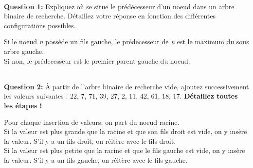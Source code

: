 \documentclass[iutinfo,a4paper,10pt]{ustl-tdtp}
\begin{document}
~\\ \textbf{Question 1:} Expliquez où se situe le prédécesseur d'un noeud dans
un arbre binaire de recherche. Détaillez votre réponse en fonction des
différentes configurations possibles.

\begin{solution}
{\color{red}
Si le noeud \emph{n} possède un fils gauche, le prédecesseur de \emph{n} est le maximum du sous arbre gauche.\\
	Si non, le prédecesseur est le premier parent gauche du noeud.}
\end{solution}

~\\ \textbf{Question 2:} À partir de l'arbre binaire de recherche
vide, ajoutez successivement les valeurs suivantes : 22, 7, 71, 39,
27, 2, 11, 42, 61, 18, 17. \textbf{Détaillez toutes les étapes !}\\

\begin{solution}
{\color{red}
Pour chaque insertion de valeurs, on part du noeud racine. \\
	Si la valeur est plus grande que la racine et que son fils droit est vide, on y insère la valeur. S'il y a un fils droit, on réitère avec le fils droit. \\
	Si la valeur est plus petite que la racine et que le fils gauche est vide, on y insère la valeur. S'il y a un fils gauche, on réitère avec le fils gauche.

\begin{center}
\end{center}
}
\end{solution}
\end{document}
